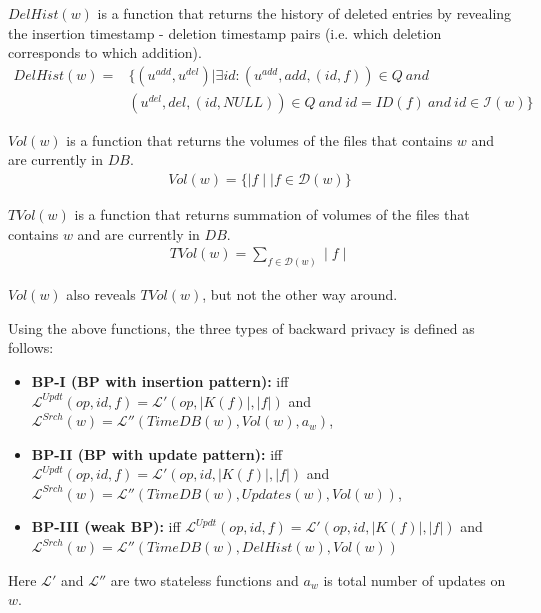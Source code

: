 \documentclass[sigconf]{acmart}
\newcommand{\DB}[1]{\mathcal{D}(#1)}
\newcommand{\vol}[1]{\lvert{#1}\rvert}
\begin{document}
$DelHist(w)$ is a function that returns the history of deleted entries by revealing the insertion timestamp - deletion timestamp pairs (i.e. which deletion corresponds to which addition).
\begin{align*}
    DelHist(w) = &\{(u^{add},u^{del} ) | \exists id : (u^{add}, add, (id,f)) \in Q  ~ and ~\\
    & (u^{del} , del, (id,NULL)) \in Q ~and~ id = ID(f) ~and~ id \in \mathcal{I}(w)\}
\end{align*}

$Vol(w)$ is a function that returns the volumes of the files that contains $w$ and are currently in $DB$.
\begin{align*}
    Vol(w) = \{\mid f\mid  | f\in \DB{w}  \}
\end{align*}

$TVol(w)$ is a function that returns summation of volumes of the files that contains $w$ and are currently in $DB$.
\begin{align*}
    TVol(w) = \sum_{f \in \DB{w}} \mid f \mid 
\end{align*}

$Vol(w)$ also reveals $TVol(w)$, but not the other way around.

Using the above functions, the three types of backward privacy is defined \cite{RBCCS17} as follows: 
\begin{itemize}
    \item[] \textbf{BP-I (BP with insertion pattern):} iff \\ $\mathcal{L}^{Updt}(op, id, f) = \mathcal{L}'(op,\vol{K(f)},\vol{f})$ and \\ 
    $\mathcal{L}^{Srch}(w) = \mathcal{L}''(TimeDB(w), Vol(w), a_w)$,
    \item[] \textbf{BP-II (BP with update pattern):} iff $\mathcal{L}^{Updt}(op, id, f) = \mathcal{L}'(op, id, \vol{K(f)},\vol{f})$
    and \\ 
    $\mathcal{L}^{Srch}(w) = \mathcal{L}''(TimeDB(w), Updates(w), Vol(w))$,
    \item[]  \textbf{BP-III (weak BP):} iff $\mathcal{L}^{Updt}(op, id, f) = \mathcal{L}'(op, id, \vol{K(f)},\vol{f})$ and \\ 
    $\mathcal{L}^{Srch}(w) = \mathcal{L}''(TimeDB(w), DelHist(w), Vol(w))$
\end{itemize}

Here $\mathcal{L}'$ and $\mathcal{L}''$ are two stateless functions and $a_w$ is total number of updates on $w$.%
\end{document}
